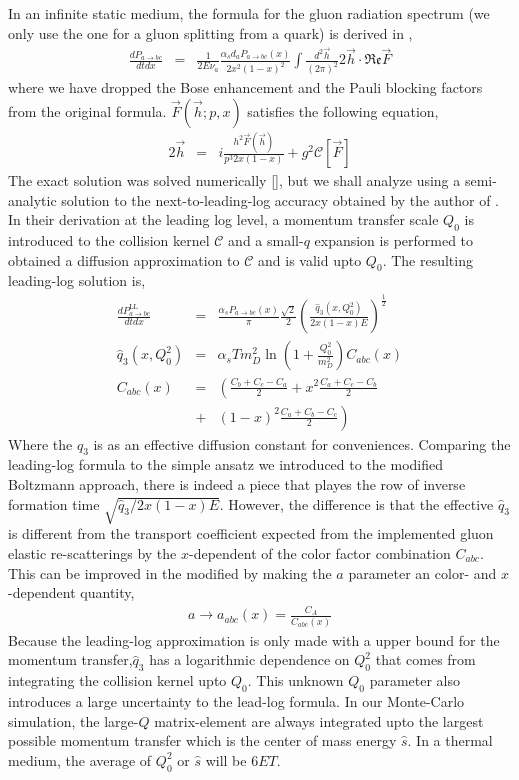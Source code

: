 \documentclass[aps, prc, reprint, amsmath, groupedaddress, nofootinbib]{revtex4-1}
\begin{document}
In an infinite static medium, the formula for the gluon radiation spectrum (we only use the one for a gluon splitting from a quark) is derived in \cite{Arnold:2002zm,Arnold:2003zc},
\begin{eqnarray}\label{eq:AMY-1}
\nonumber
\frac{dP_{a\rightarrow bc}}{dt dx} &=& \frac{1}{2E\nu_a} \frac{\alpha_s d_a P_{a\rightarrow bc}(x)}{2x^2(1-x)^2}\int\frac{d^2\vec{h}}{(2\pi)^2}2\vec{h}\cdot \mathfrak{Re} \vec{F}
\end{eqnarray}
where we have dropped the Bose enhancement and the Pauli blocking factors from the original formula.
$\vec{F}(\vec{h}; p, x)$ satisfies the following equation,
\begin{eqnarray}\label{eq:AMY-2}
\nonumber
2\vec{h} &=& i\frac{h^2 \vec{F}(\vec{h})}{p^3 2x(1-x)} + g^2 \mathcal{C}[\vec{F}]
\end{eqnarray} 
The exact solution was solved numerically [], but we shall analyze using a semi-analytic solution to the next-to-leading-log accuracy obtained by the author of \cite{Arnold:2008zu}.
In their derivation at the leading log level, a momentum transfer scale $Q_0$ is introduced to the collision kernel $\mathcal{C}$ and a small-$q$ expansion is performed to obtained a diffusion approximation to $\mathcal{C}$ and is valid upto $Q_0$.
The resulting leading-log solution is,
\begin{eqnarray}\label{eq:AMY-LL}
\frac{dP_{a\rightarrow bc}^{\textrm{LL}}}{dt dx} &=& \frac{\alpha_s P_{a\rightarrow bc}(x)}{\pi}\frac{\sqrt{2}}{2}
\left(\frac{\hat{q}_3(x, Q_0^2)}{2x(1-x)E}\right)^{\frac{1}{2}}\\
\hat{q}_3(x, Q_0^2) &=& \alpha_s T m_D^2 \ln\left(1+\frac{Q_0^2}{m_D^2}\right) C_{abc}(x)\\
C_{abc}(x) &=&  \left(\frac{C_b+C_c-C_a}{2} + x^2 \frac{C_a+C_c-C_b}{2} \right.\\
&+& \left.(1-x)^2\frac{C_a+C_b-C_c}{2}\right)
\end{eqnarray}
Where the $\hat{q}_3$ is as an effective diffusion constant for conveniences. 
Comparing the leading-log formula to the simple ansatz we introduced to the modified Boltzmann approach, there is indeed a piece that playes the row of inverse formation time $\sqrt{\hat{q}_3 / 2x(1-x)E}$. However, the difference is that the effective $\hat{q}_3$ is different from the transport coefficient expected from the implemented gluon elastic re-scatterings by the $x$-dependent of the color factor combination $C_{abc}$.
This can be improved in the modified by making the $a$ parameter an color- and $x$-dependent quantity,
\begin{eqnarray}
a \rightarrow a_{abc}(x) = \frac{C_A}{C_{abc}(x)}
\end{eqnarray}
Because the leading-log approximation is only made with a upper bound for the momentum transfer,$\hat{q}_3$ has a logarithmic dependence on $Q_0^2$ that comes from integrating the collision kernel upto $Q_0$.
This unknown $Q_0$ parameter also introduces a large uncertainty to the lead-log formula.
In our Monte-Carlo simulation, the large-$Q$ matrix-element are always integrated upto the largest possible momentum transfer which is the center of mass energy $\hat{s}$.
In a thermal medium, the average of $Q_0^2$ or $\hat{s}$ will be $6ET$.
\end{document}
